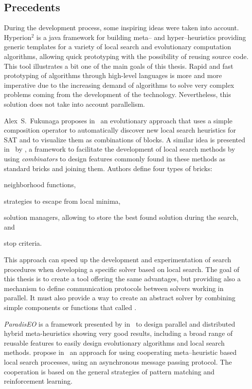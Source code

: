 \subsection{Precedents}

During the development process, some inspiring ideas were taken into account. {\sc Hyperion}$^2$ \cite{Brownlee2014} is a java framework for building meta-- and hyper--heuristics providing generic templates for a variety of local search and evolutionary computation algorithms, allowing quick prototyping with the possibility of reusing source code. This tool illustrates a bit one of the main goals of this thesis. Rapid and fast prototyping of algorithms through high-level languages is more and more imperative due to the increasing demand of algorithms to solve very complex problems coming from the development of the technology. Nevertheless, this solution does not take into account parallelism.

Alex~S.~Fukunaga proposes in~\cite{Fukunaga2008} an evolutionary approach that uses a simple composition operator to automatically discover new local search heuristics for SAT and to visualize them as combinations of blocks. A similar idea is presented in~\cite{Landtsheer2015} by , a framework to facilitate the development of local search methods by using \textit{combinators} to design features commonly found in these methods as standard bricks and joining them. Authors define four types of bricks: \begin{inparaenum}[1-] \item neighborhood functions, \item strategies to escape from local minima, \item solution managers, allowing to store the best found solution during the search, and \item stop criteria.
\end{inparaenum} This approach can speed up the development and experimentation of search procedures when developing a specific solver based on local search. The goal of this thesis is to create a tool offering the same advantages, but providing also a mechanism to define communication protocols between solvers working in parallel. It must also provide a way to create an abstract solver by combining simple components or functions that called \ms.

{\it ParadisEO} is a framework presented by  in~\cite{Cahon2004} to design parallel and distributed hybrid meta-heuristics showing very good results, including a broad range of reusable features to easily design evolutionary algorithms and local search methods.  propose in~\cite{Martin2016} an approach for using cooperating meta--heuristic based local search processes, using an asynchronous message passing protocol. The cooperation is based on the general strategies of pattern matching and reinforcement learning. 

